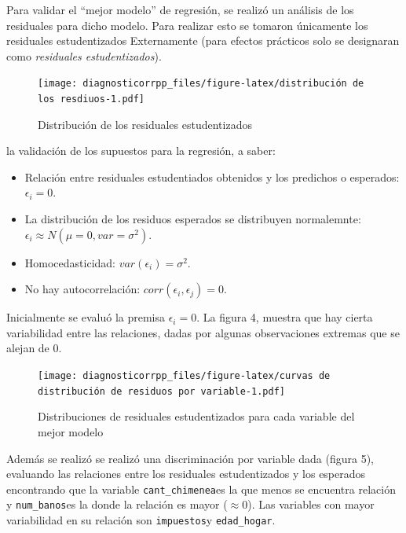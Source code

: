 \documentclass[
]{article}
\begin{document}
Para validar el ``mejor modelo'' de regresión, se realizó un análisis de
los residuales para dicho modelo. Para realizar esto se tomaron
únicamente los residuales estudentizados Externamente (para efectos
prácticos solo se designaran como \emph{residuales estudentizados}).

\begin{figure}
\centering
\texttt{[image: diagnosticorrpp\_files/figure-latex/distribución de los resdiuos-1.pdf]}
\caption{Distribución de los residuales estudentizados}
\end{figure}

la validación de los supuestos para la regresión, a saber:

\begin{itemize}
\item
  Relación entre residuales estudentiados obtenidos y los predichos o
  esperados: \(\epsilon_i = 0\).
\item
  La distribución de los residuos esperados se distribuyen normalemnte:
  \(\epsilon_i \approx N(\mu =0, var=\sigma^2)\).
\item
  Homocedasticidad: \(var(\epsilon_i) = \sigma^2\).
\item
  No hay autocorrelación: \(corr(\epsilon_i, \epsilon_j) = 0\).
\end{itemize}

Inicialmente se evaluó la premisa \(\epsilon_i = 0\). La figura 4,
muestra que hay cierta variabilidad entre las relaciones, dadas por
algunas observaciones extremas que se alejan de 0.

\begin{figure}
\centering
\texttt{[image: diagnosticorrpp\_files/figure-latex/curvas de distribución de residuos por variable-1.pdf]}
\caption{Distribuciones de residuales estudentizados para cada variable
del mejor modelo}
\end{figure}

Además se realizó se realizó una discriminación por variable dada
(figura 5), evaluando las relaciones entre los residuales estudentizados
y los esperados encontrando que la variable \texttt{cant\_chimenea}es la
que menos se encuentra relación y \texttt{num\_banos}es la donde la
relación es mayor (\(\approx 0\)). Las variables con mayor variabilidad
en su relación son \texttt{impuestos}y \texttt{edad\_hogar}.
\end{document}
